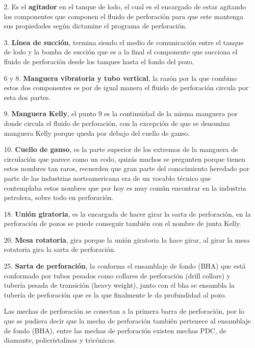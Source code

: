 2. Es el \textbf{agitador} en el tanque de lodo, el cual es el encargado de estar agitando los componentes que componen el fluido de perforación para que este mantenga sus propiedades según dictamine el programa de perforación.

3. \textbf{Línea de succión}, termina siendo el medio de comunicación entre el tanque de lodo y la bomba de succión que es a la final el componente que succiona el fluido de perforación desde los tanques hasta el fondo del pozo.

6 y 8. \textbf{Manguera vibratoria y tubo vertical}, la razón por la que combino estos dos componentes es por de igual manera el fluido de perforación circula por esta dos partes.

9. \textbf{Manguera Kelly}, el punto 9 es la continuidad de la misma manguera por donde circula el fluido de perforación, con la excepción de que se denomina manguera Kelly porque queda por debajo del cuello de ganso.

10. \textbf{Cuello de ganso}, es la parte superior de los extremos de la manguera de circulación que parece como un codo, quizás muchos se pregunten porque tienen estos nombres tan raros, recuerden que gran parte del conocimiento heredado por parte de las industrias norteamericana era de un vocablo técnico que contemplaba estos nombres que por hoy es muy común encontrar en la industria petrolera, sobre todo en perforación.

18. \textbf{Unión giratoria}, es la encargada de hacer girar la sarta de perforación, en la perforación de pozos se puede conseguir también con el nombre de junta Kelly.

20. \textbf{Mesa rotatoria}, gira porque la unión giratoria la hace girar, al girar la mesa rotatoria gira la sarta de perforación.

25. \textbf{Sarta de perforación}, la conforma el ensamblaje de fondo (BHA) que está conformado por tubos pesados como collares de perforación (drill collars) y tubería pesada de transición (heavy weight), junto con el bha se ensambla la tubería de perforación que es la que finalmente le da profundidad al pozo.

Las mechas de perforación se conectan a la primera barra de perforación, por lo que se pudiera decir que la mecha de perforación también pertenece al ensamblaje de fondo (BHA), entre las mechas de perforación existen mechas PDC, de diamante, policristalinas y tricónicas.




